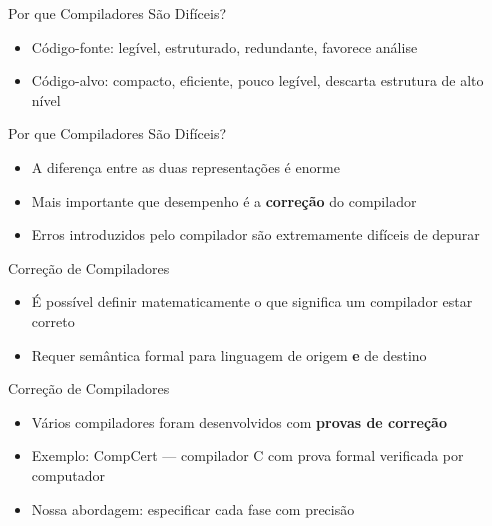 \begin{frame}{Por que Compiladores São Difíceis?}

    \begin{itemize}

        \item
        Código-fonte: legível, estruturado, redundante, favorece análise
        \item
        Código-alvo: compacto, eficiente, pouco legível, descarta estrutura de
        alto nível
    \end{itemize}
\end{frame}

\begin{frame}{Por que Compiladores São Difíceis?}

    \begin{itemize}

        \item
        A diferença entre as duas representações é enorme
        \item
        Mais importante que desempenho é a \textbf{correção} do compilador
        \item
        Erros introduzidos pelo compilador são extremamente difíceis de
        depurar
    \end{itemize}
\end{frame}

\begin{frame}{Correção de Compiladores}

    \begin{itemize}

        \item
        É possível definir matematicamente o que significa um compilador estar
        correto
        \item
        Requer semântica formal para linguagem de origem \textbf{e} de destino
    \end{itemize}
\end{frame}

\begin{frame}{Correção de Compiladores}

    \begin{itemize}

        \item
        Vários compiladores foram desenvolvidos com \textbf{provas de
        correção}
        \item
        Exemplo: CompCert --- compilador C com prova formal verificada por
        computador
        \item
        Nossa abordagem: especificar cada fase com precisão
    \end{itemize}
\end{frame}




